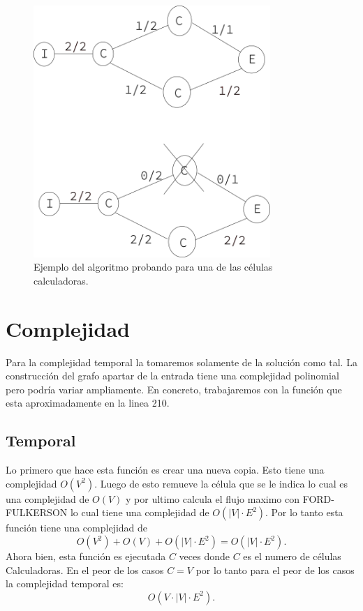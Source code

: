 \documentclass[12pt]{exam}
\begin{document}
\begin{figure}[H]
  \centering
  \includegraphics[width=0.8\textwidth]{img/explicacion.png}
  \caption{Ejemplo del algoritmo probando para una de las células calculadoras.}
  \label{fig:explicacion}
\end{figure}

\section{Complejidad}

Para la complejidad temporal la tomaremos solamente de la solución como tal. La construcción del grafo apartar de la entrada tiene una complejidad polinomial pero podría variar ampliamente. En concreto, trabajaremos con la función  que esta aproximadamente en la linea 210.

\subsection{Temporal}

Lo primero que hace esta función es crear una nueva copia. Esto tiene una complejidad $O\left( V^2 \right) $. Luego de esto remueve la célula que se le indica lo cual es una complejidad de $O\left( V \right)$ y por ultimo calcula el flujo maximo con FORD-FULKERSON lo cual tiene una complejidad de $O\left( \left| V \right| \cdot E^2 \right) $. Por lo tanto esta función tiene una complejidad de \[
O\left( V^2 \right) + O\left( V \right) + O\left( \left| V \right| \cdot E^2 \right) = O\left( \left| V \right| \cdot E^2 \right) 
.\] Ahora bien, esta función es ejecutada $C$ veces donde $C$ es el numero de células Calculadoras. En el peor de los casos $C = V$ por lo tanto para el peor de los casos la complejidad temporal es: \[
O\left( V \cdot \left| V \right| \cdot E^2 \right) 
.\] 
\end{document}
